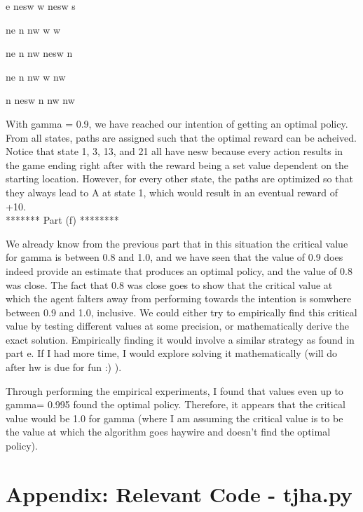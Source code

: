 \documentclass[11pt]{article}
\begin{document}
e nesw w nesw s 

ne n nw w w 

ne n nw nesw n 

ne n nw w nw 

n nesw n nw nw 

With gamma = 0.9, we have reached our intention of getting an optimal policy. From all states, paths are assigned such that the optimal reward can be acheived. Notice that state 1, 3, 13, and 21 all have nesw because every action results in the game ending right after with the reward being a set value dependent on the starting location. However, for every other state, the paths are optimized so that they always lead to A at state 1, which would result in an eventual reward of +10.\\



******* Part (f) ********

We already know from the previous part that in this situation the critical value for gamma is between 0.8 and 1.0, and we have seen that the value of 0.9 does indeed provide an estimate that produces an optimal policy, and the value of 0.8 was close. The fact that 0.8 was close goes to show that the critical value at which the agent falters away from performing towards the intention is somwhere between 0.9 and 1.0, inclusive. We could either try to empirically find this critical value by testing different values at some precision, or mathematically derive the exact solution. Empirically finding it would involve a similar strategy as found in part e. If I had more time, I would explore solving it mathematically (will do after hw is due for fun :) ).

Through performing the empirical experiments, I found that values even up to gamma= 0.995 found the optimal policy. Therefore, it appears that the critical value would be 1.0 for gamma (where I am assuming the critical value is to be the value at which the algorithm goes haywire and doesn't find the optimal policy).




 
 
 





\section*{Appendix: Relevant Code - tjha.py}
%   
\end{document}
